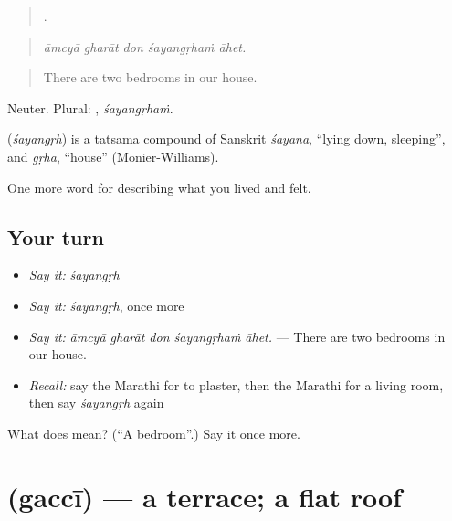 \begin{quote}
    .
\end{quote}

\begin{quote}
\emph{āmcyā gharāt don śayangṛhaṁ āhet.}
\end{quote}

\begin{quote}
There are two bedrooms in our house.
\end{quote}

Neuter. Plural: , \emph{śayangṛhaṁ}.

\begin{cousinweb}
\textbf{} (\emph{śayangṛh}) is a tatsama compound of Sanskrit \emph{śayana}, \textquotedblleft{}lying down, sleeping\textquotedblright{}, and \emph{gṛha}, \textquotedblleft{}house\textquotedblright{} (Monier-Williams).
\end{cousinweb}

\begin{grammarlens}[title={What you've built}]
One more word for describing what you lived and felt.
\end{grammarlens}

\subsection*{Your turn}
\begin{itemize}
\raggedright
  \item \emph{Say it:} \emph{śayangṛh}
  \item \emph{Say it:} \emph{śayangṛh}, once more
  \item \emph{Say it:} \emph{āmcyā gharāt don śayangṛhaṁ āhet.} — There are two bedrooms in our house.
  \item \emph{Recall:} say the Marathi for to plaster, then the Marathi for a living room, then say \emph{śayangṛh} again
\end{itemize}

\begin{tcolorbox}[breakable,colback=teal!4,colframe=teal!35!black,title={Before you move on}]
What does  mean? (\textquotedblleft{}A bedroom\textquotedblright{}.) Say it once more.
\end{tcolorbox}
\section[\texorpdfstring{\mr{गच्ची} (gaccī)}{गच्ची (gaccī)}]{ (gaccī) — a terrace; a flat roof}

